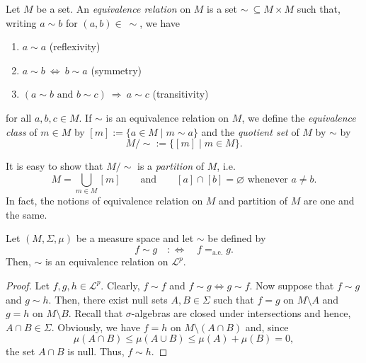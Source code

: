 \begin{definition}
Let $M$ be a set. An \emph{equivalence relation} on $M$ is a set $\sim\ \subseteq M\times M$ such that, writing $a\sim b$ for $(a,b)\in\ \sim$, we have
\begin{enumerate}[label=(\roman*)]
\item $a\sim a$ \hfill (reflexivity)
\item $a\sim b \ \Leftrightarrow\ b\sim a$ \hfill (symmetry)
\item $(a \sim b \text{ and } b\sim c) \ \Rightarrow \ a\sim c$ \hfill (transitivity)
\end{enumerate}
for all $a,b,c\in M$. If $\sim$ is an equivalence relation on $M$, we define the \emph{equivalence class} of $m\in M$ by $[m]:=\{a\in M \mid m\sim a\}$ and the \emph{quotient set} of $M$ by $\sim$ by
\begin{equation*}
M/{\sim} := \{[m]\mid m\in M\}.
\end{equation*}
\end{definition}
It is easy to show that $M/{\sim}$ is a \emph{partition} of $M$, i.e.\
\begin{equation*}
M = \bigcup_{m\in M}[m] \qquad \text{and}\qquad [a]\cap [b]=\varnothing \text{ whenever } a\neq b.
\end{equation*}
In fact, the notions of equivalence relation on $M$ and partition of $M$ are one and the same.

\begin{lemma}
Let $(M,\Sigma,\mu)$ be a measure space and let $\sim$ be defined by
\begin{equation*}
f\sim g \quad :\Leftrightarrow \quad f=_{\mathrm{a.e.}}g.
\end{equation*}
Then, $\sim$ is an equivalence relation on $\mathscr{L}^p$.
\end{lemma}

\begin{proof}
Let $f,g,h\in\mathscr{L}^p$. Clearly, $f\sim f$ and $f\sim g \Leftrightarrow g \sim f$. Now suppose that $f\sim g$ and $g\sim h$. Then, there exist null sets $A,B\in\Sigma$ such that $f=g$ on $M\setminus A$ and $g=h$ on $M\setminus B$. Recall that $\sigma$-algebras are closed under intersections and hence, $A\cap B\in\Sigma$. Obviously, we have $f=h$ on $M\setminus (A\cap B)$ and, since
\begin{equation*}
\mu(A\cap B) \leq \mu (A\cup B) \leq \mu(A)+\mu(B) = 0,
\end{equation*}
the set $A\cap B$ is null. Thus, $f\sim h$.
\end{proof}


